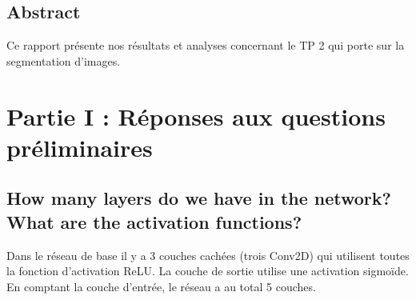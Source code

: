 \documentclass{name}
\begin{document}


        
\hypersetup{pageanchor=false}
\fairemarges
\fairepagedegarde
\hypersetup{pageanchor=true}

\newpage
{}

\begin{center}
	\begin{minipage}{13cm}
	    \begin{center}
	        \section*{Abstract}
	    \end{center}
		Ce rapport présente nos résultats et analyses concernant le TP 2 qui porte sur la segmentation d'images.
	\end{minipage}
\end{center}

\newpage
\tableofcontents

\newpage
{}
\setcounter{page}{1}

\section{Partie I : Réponses aux questions préliminaires}

\subsection{How many layers do we have in the network? What are the activation functions?}
Dans le réseau de base il y a 3 couches cachées (trois Conv2D) qui utilisent toutes la fonction d'activation ReLU. La couche de sortie utilise une activation sigmoïde. En comptant la couche d'entrée, le réseau a au total 5 couches.
\end{document}
